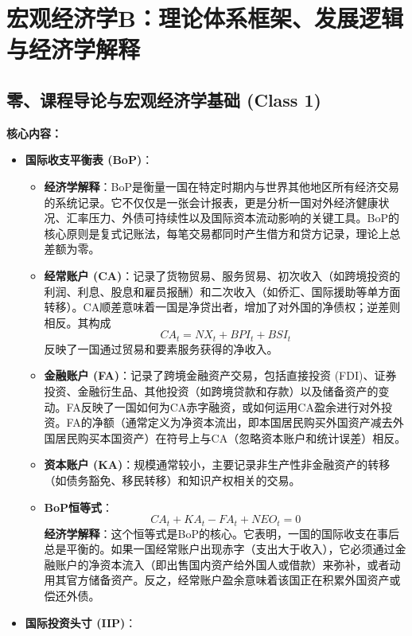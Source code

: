 \documentclass[12pt]{article}
\begin{document}
\section*{宏观经济学B：理论体系框架、发展逻辑与经济学解释}

\subsection*{零、课程导论与宏观经济学基础 (Class 1)}

\textbf{核心内容：}
\begin{itemize}
    \item \textbf{国际收支平衡表 (BoP)}：
    \begin{itemize}
        \item \textbf{经济学解释}：BoP是衡量一国在特定时期内与世界其他地区所有经济交易的系统记录。它不仅仅是一张会计报表，更是分析一国对外经济健康状况、汇率压力、外债可持续性以及国际资本流动影响的关键工具。BoP的核心原则是复式记账法，每笔交易都同时产生借方和贷方记录，理论上总差额为零。
        \item \textbf{经常账户 (CA)}：记录了货物贸易、服务贸易、初次收入（如跨境投资的利润、利息、股息和雇员报酬）和二次收入（如侨汇、国际援助等单方面转移）。CA顺差意味着一国是净贷出者，增加了对外国的净债权；逆差则相反。其构成
        \[
        CA_t = NX_t + BPI_t + BSI_t
        \]
        反映了一国通过贸易和要素服务获得的净收入。
        \item \textbf{金融账户 (FA)}：记录了跨境金融资产交易，包括直接投资 (FDI)、证券投资、金融衍生品、其他投资（如跨境贷款和存款）以及储备资产的变动。FA反映了一国如何为CA赤字融资，或如何运用CA盈余进行对外投资。FA的净额（通常定义为净资本流出，即本国居民购买外国资产减去外国居民购买本国资产）在符号上与CA（忽略资本账户和统计误差）相反。
        \item \textbf{资本账户 (KA)}：规模通常较小，主要记录非生产性非金融资产的转移（如债务豁免、移民转移）和知识产权相关的交易。
        \item \textbf{BoP恒等式}：
        \[
        CA_t + KA_t - FA_t + NEO_t = 0
        \]
        \textbf{经济学解释}：这个恒等式是BoP的核心。它表明，一国的国际收支在事后总是平衡的。如果一国经常账户出现赤字（支出大于收入），它必须通过金融账户的净资本流入（即出售国内资产给外国人或借款）来弥补，或者动用其官方储备资产。反之，经常账户盈余意味着该国正在积累外国资产或偿还外债。
    \end{itemize}
    \item \textbf{国际投资头寸 (IIP)}：
    \begin{itemize}

\end{itemize}
\end{itemize}
\end{document}
